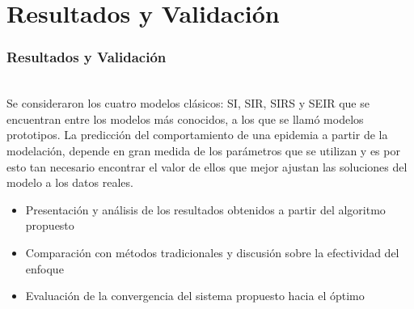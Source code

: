 \chapter{Resultados y Validación}\label{chapter:resultsValidation}

\label{sec:17}
\subsection*{ \Large Resultados y Validación } \\

    Se consideraron los cuatro modelos clásicos:
    SI, SIR, SIRS y SEIR que se encuentran entre los modelos más conocidos, a los
    que se llamó modelos prototipos.
    La predicción del comportamiento de una epidemia a partir de la modelación,
    depende en gran medida de los parámetros que se utilizan y es por esto tan
    necesario encontrar el valor de ellos que mejor ajustan las soluciones del modelo
    a los datos reales. \\

    \begin{itemize}
        \item  Presentación y análisis de los resultados obtenidos a partir del algoritmo propuesto
        \item  Comparación con métodos tradicionales y discusión sobre la efectividad del enfoque
        \item  Evaluación de la convergencia del sistema propuesto hacia el óptimo
    \end{itemize}
